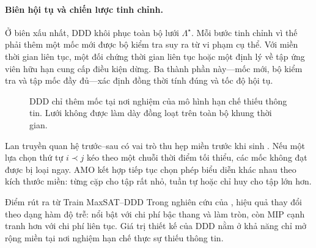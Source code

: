\paragraph{Biên hội tụ và chiến lược tinh chỉnh.}
Ở biên xấu nhất, DDD khôi phục toàn bộ lưới \(\Lambda^\star\). Mỗi bước tinh
chỉnh vì thế phải thêm một mốc mới được bộ kiểm tra suy ra từ vi phạm cụ thể.
Với miền thời gian liên tục, một đối chứng thời gian liên tục hoặc một định lý
về tập ứng viên hữu hạn cung cấp điều kiện dừng. Ba thành phần này---mốc mới, bộ kiểm tra và
tập mốc đầy đủ---xác định đồng thời tính đúng và tốc độ hội tụ.

\begin{figure}[tb]
\centering
{}
\caption{DDD chỉ thêm mốc tại nơi nghiệm của mô hình hạn chế thiếu thông tin.
Lưới không được làm dày đồng loạt trên toàn bộ khung thời gian.}
\label{fig:ddd-refinement}
\end{figure}

Lan truyền quan hệ trước--sau có vai trò thu hẹp miền trước khi sinh \CNF. Nếu một
lựa chọn thứ tự \(i\prec j\) kéo theo một chuỗi thời điểm tối thiểu, các mốc
không đạt được bị loại ngay. AMO kết hợp tiếp tục chọn phép biểu diễn khác nhau
theo kích thước miền: từng cặp cho tập rất nhỏ, tuần tự hoặc chỉ huy cho tập lớn hơn.

\begin{resultbox}{Điểm rút ra từ Train MaxSAT--DDD}
Trong nghiên cứu của \textcite{kieu2026train}, hiệu quả thay đổi theo
dạng hàm độ trễ: \MaxSAT nổi bật với chi phí bậc thang và làm tròn, còn MIP cạnh
tranh hơn với chi phí liên tục. Giá trị thiết kế của DDD nằm ở khả năng chỉ mở
rộng miền tại nơi nghiệm hạn chế thực sự thiếu thông tin.
\end{resultbox}

